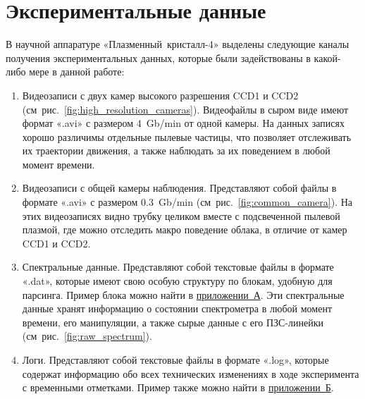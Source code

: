 \section{Экспериментальные данные}
\label{cha:ch_3_4}
В научной аппаратуре «Плазменный~кристалл-4» выделены следующие каналы получения экспериментальных данных,
которые были задействованы в какой-либо мере в данной работе:
\begin{enumerate}
    \item Видеозаписи с двух камер высокого разрешения CCD1 и CCD2 (см~рис.~\ref{fig:high_resolution_cameras}).
    Видеофайлы в сыром виде имеют формат «.avi» с размером 4~Gb/min от одной камеры. На данных записях хорошо
    различимы отдельные пылевые частицы, что позволяет отслеживать их траектории движения, а также наблюдать за
    их поведением в любой момент времени.

    \item Видеозаписи с общей камеры наблюдения. Представляют собой файлы в формате «.avi» с размером 0.3~Gb/min (см~рис.~\ref{fig:common_camera}).
    На этих видеозаписях видно трубку целиком вместе с подсвеченной пылевой плазмой, где можно отследить макро поведение
    облака, в отличие от камер CCD1 и CCD2.

    \item Спектральные данные. Представляют собой текстовые файлы в формате «.dat», которые имеют свою особую структуру
    по блокам, удобную для парсинга. Пример блока можно найти в \hyperref[app:app1]{приложении~А}. Эти спектральные данные
    хранят информацию о состоянии спектрометра в любой момент времени, его манипуляции, а также сырые данные с его ПЗС-линейки (см~рис.~\ref{fig:raw_spectrum}).



    \item Логи. Представляют собой текстовые файлы в формате «.log», которые содержат информацию обо всех
    технических изменениях в ходе эксперимента с временными отметками. Пример также можно найти в \hyperref[app:app2]{приложении~Б}.
\end{enumerate}
